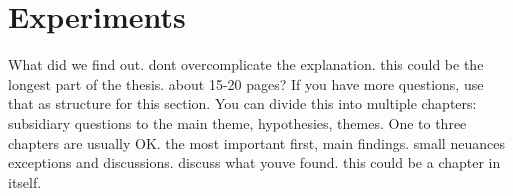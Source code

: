 \chapter{Experiments}                     %

{\color{red}What did we find out. dont overcomplicate the explanation. this could be the longest part of the thesis. about 15-20 pages? If you have more questions, use that as structure for this section. You can divide this into multiple chapters: subsidiary questions to the main theme, hypothesies, themes. One to three chapters are usually OK. the most important first, main findings. small neuances exceptions and discussions. discuss what youve found. this could be a chapter in itself.}


